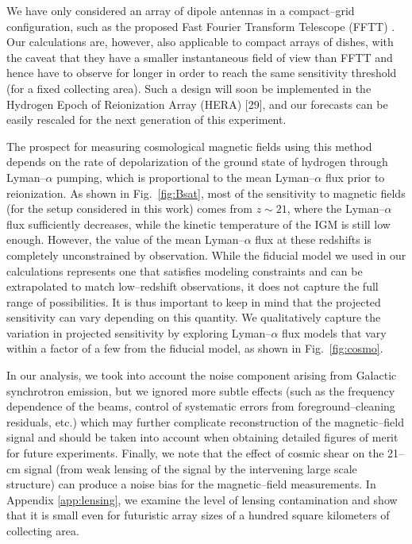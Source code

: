 \documentclass[aps,prd,twocolumn,floatfix,showpacs,superscriptaddress,nofootinbib]{revtex4-1}
\begin{document}
We have only considered an array of dipole antennas in a compact--grid configuration, such as the proposed Fast Fourier Transform Telescope (FFTT) \cite{2009PhRvD..79h3530T}. Our calculations are, however, also applicable to compact arrays of dishes, with the caveat that they have a smaller instantaneous field of view than FFTT and hence have to observe for longer in order to reach the same sensitivity threshold (for a fixed collecting area). Such a design will soon be implemented in the Hydrogen Epoch of Reionization Array (HERA) [29], and our forecasts can be easily rescaled for the next generation of this experiment.

The prospect for measuring cosmological magnetic fields using this method depends on the rate of depolarization of the ground state of hydrogen through Lyman--$\alpha$ pumping, which is proportional to the mean Lyman--$\alpha$ flux prior to reionization. As shown in Fig.~\ref{fig:Bsat}, most of the sensitivity to magnetic fields (for the setup considered in this work) comes from $z\sim 21$, where the Lyman--$\alpha$ flux sufficiently decreases, while the kinetic temperature of the IGM is still low enough. However, the value of the mean Lyman--$\alpha$ flux at these redshifts is completely unconstrained by observation. While the fiducial model we used in our calculations represents one that satisfies modeling constraints and can be extrapolated to match low--redshift observations, it does not capture the full range of possibilities. It is thus important to keep in mind that the projected sensitivity can vary depending on this quantity. We qualitatively capture the variation in projected sensitivity by exploring Lyman--$\alpha$ flux models that vary within a factor of a few from the fiducial model, as shown in Fig.~\ref{fig:cosmo}.

In our analysis, we took into account the noise component arising from Galactic synchrotron emission, but we ignored more subtle effects (such as the frequency dependence of the beams, control of systematic errors from foreground--cleaning residuals, etc.) which may further complicate reconstruction of the magnetic--field signal and should be taken into account when obtaining detailed figures of merit for future experiments.
Finally, we note that the effect of cosmic shear on the 21--cm signal (from weak lensing of the signal by the intervening large scale structure) can produce a noise bias for the magnetic--field measurements. In Appendix \ref{app:lensing}, we examine the level of lensing contamination and show that it is small even for futuristic array sizes of a hundred square kilometers of collecting area. 
\end{document}
